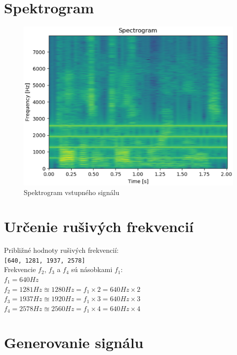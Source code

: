 \documentclass{article}
\begin{document}
  \section{Spektrogram}

  \begin{figure}[H]
    \includegraphics[width=\textwidth]{src/spectrogram.eps}
    \caption{Spektrogram vstupného signálu}
  \end{figure}


  \section{Určenie rušivých frekvencií}
  Približné hodnoty rušivých frekvencií: \\
  \verb|[640, 1281, 1937, 2578]| \\

  \noindent
  Frekvencie $f_2$, $f_3$ a $f_4$ sú násobkami $f_1$: \\
  $f_1 = 640Hz$ \\
  $f_2 = 1281Hz \approxeq 1280Hz = f_1 \times 2 = 640Hz \times 2$ \\
  $f_3 = 1937Hz \approxeq 1920Hz = f_1 \times 3 = 640Hz \times 3$ \\
  $f_4 = 2578Hz \approxeq 2560Hz = f_1 \times 4 = 640Hz \times 4$


  \section{Generovanie signálu}
\end{document}
